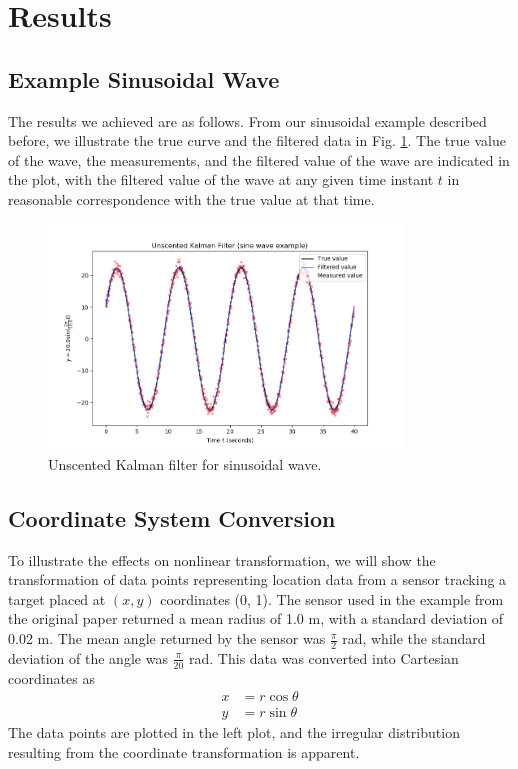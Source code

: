 \documentclass[]{article}
\begin{document}
\section{Results}

\subsection{Example Sinusoidal Wave}
\label{sec:sine}

The results we achieved are as follows. From our sinusoidal example described before, we illustrate the true curve and the filtered data in Fig. \ref{fig:ukf_sine}. The true value of the wave, the measurements, and the filtered value of the wave are indicated in the plot, with the filtered value of the wave at any given time instant $t$ in reasonable correspondence with the true value at that time.

\begin{figure}[t]
\centerline{\includegraphics[height=6cm]{sine_example.png}}
\caption{Unscented Kalman filter for sinusoidal wave.}
\label{fig:ukf_sine}
\end{figure}

\subsection{Coordinate System Conversion}
\label{sec:cart_polar}

To illustrate the effects on nonlinear transformation, we will show the transformation of data points representing location data from a sensor tracking a target placed at $(x, y)$ coordinates (0, 1). The sensor used in the example from the original paper returned a mean radius of 1.0 m, with a standard deviation of 0.02 m. The mean angle returned by the sensor was $\frac{\pi}{2}$ rad, while the standard deviation of the angle was $\frac{\pi}{20}$ rad. This data was converted into Cartesian coordinates as
\begin{equation}
\begin{split}
x & = r\cos{\theta} \\
y & = r\sin{\theta}
\end{split}
\label{equ:polar_to_cartesian}
\end{equation}
The data points are plotted in the left plot, and the irregular distribution resulting from the coordinate transformation is apparent.
\end{document}
